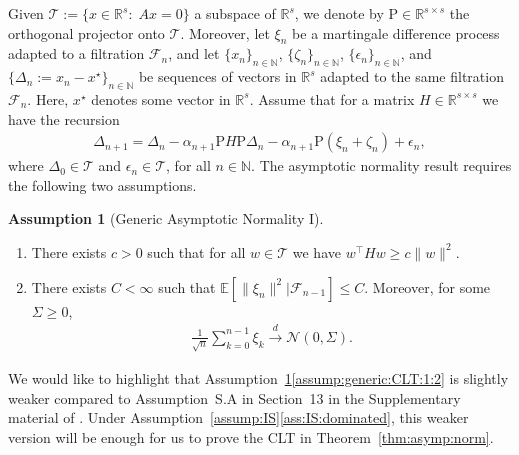 \documentclass[11pt,a4paper]{article}
\theoremstyle{definition}
\newtheorem{assumption}[theorem]{Assumption}
\begin{document}
Given $\mathcal T := \{x \in \mathbb R^s:\; A x = 0\}$ a subspace of $\mathbb R^s$, we denote by $\text{P} \in \mathbb R^{s \times s}$ the orthogonal projector onto $\mathcal T$. Moreover, let $\xi_n$ be a martingale difference process adapted to a filtration $\mathcal F_n$, and let $\{x_n\}_{n \in \mathbb N}$, $\{\zeta_n\}_{n \in \mathbb N}$, $\{\epsilon_n\}_{n \in \mathbb N}$, and $\{\Delta_n := x_n -x^\star\}_{n \in \mathbb N}$ be sequences of vectors in $\mathbb R^s$ adapted to the same filtration $\mathcal F_n$. Here, $x^\star$ denotes some vector in $\mathbb R^s$. Assume that for a matrix $H \in \mathbb R^{s \times s}$ we have the recursion
\begin{align}
\label{eq:generic:iteration:CLT}
    \Delta_{n+1} = \Delta_n - \alpha_{n+1} \text{P} H \text{P} \Delta_n - \alpha_{n+1} \text{P} (\xi_n + \zeta_n) + \epsilon_n,
\end{align}
where $\Delta_0 \in \mathcal T$ and $\epsilon_n \in \mathcal T$, for all $n \in \mathbb N$. The asymptotic normality result requires the following two assumptions.

\begin{assumption}[Generic Asymptotic Normality I]~
\label{assump:generic:CLT:1}
\begin{enumerate}[label=(\roman*)]
    \item \label{assump:generic:CLT:1:1} There exists $c>0$ such that for all $w \in \mathcal T$ we have $w^\top H w \geq c \|w\|^2$.

    \item \label{assump:generic:CLT:1:2} There exists $C<\infty$ such that $\mathbb E\left[ \|\xi_n\|^2 | \mathcal F_{n-1} \right] \leq C$. Moreover, for some $\Sigma \geq 0$,
    \begin{align*}
        \frac{1}{\sqrt{n}} \sum_{k=0}^{n-1} \xi_k \overset{d}{\to} \mathcal N(0,\Sigma).
    \end{align*}
\end{enumerate}
\end{assumption}

We would like to highlight that Assumption~\ref{assump:generic:CLT:1}\ref{assump:generic:CLT:1:2} is slightly weaker compared to Assumption~S.A in Section~13 in the Supplementary material of \cite{duchi2021asymptotic}. Under Assumption~\ref{assump:IS}\ref{ass:IS:dominated}, this weaker version will be enough for us to prove the CLT in Theorem~\ref{thm:asymp:norm}.
\end{document}
